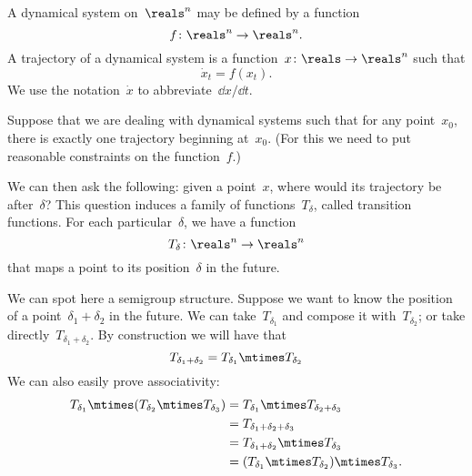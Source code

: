 \begin{example}
  \label{exa:transition-functions}
  \begin{definition}
    \label{def:ct-dynsyst}
    A dynamical system on~$\reals^n$ may be defined by a function
    \begin{equation}
      f\colon \reals^n \to \reals^n.
    \end{equation}
    A trajectory of a dynamical system is a function~$x\colon \reals \to \reals^n$ such that
    \begin{equation}
      \dot{x}_t = f(x_t).
    \end{equation}
    We use the notation~$\dot{x}$ to abbreviate~$\dd x / \dd t$.
  \end{definition}

  Suppose that we are dealing with dynamical systems such that for any point~$x_0$, there
  is exactly one trajectory beginning at~$x_0$. (For this we need to put reasonable constraints
  on the function~$f$.)

  We can then ask the following: given a point~$x$, where would its trajectory be after~$\delta$?
  This question induces a family of functions~$T_\delta$, called transition functions.
  For each particular~$\delta$, we have a function
  \begin{equation*}
    T_{\delta}\colon \reals^n \to  \reals^n
  \end{equation*}
  that maps a point to its position~$\delta$ in the future.

  We can spot here a semigroup structure. Suppose we want to know the position of a point~$\delta_1 + \delta_2$
  in the future. We can take~$T_{\delta_1}$ and compose it with~$T_{\delta_2}$; or take directly~$T_{\delta_1 + \delta_2}$.
  By construction we will have that
  \begin{equation}
    \label{eq:transition-property}
    T_{\delta_1 + \delta_2} = T_{\delta_1} \mtimes T_{\delta_2}
  \end{equation}
  We can also easily prove associativity:
  \begin{equation}
    \begin{aligned}
      T_{\delta_1}\mtimes (T_{\delta_2}\mtimes T_{\delta_3})&=T_{\delta_1}\mtimes T_{\delta_2+\delta_3}\\
      &=T_{\delta_1+\delta_2+\delta_3}\\
      &=T_{\delta_1+\delta_2}\mtimes T_{\delta_3}\\
      &=(T_{\delta_1}\mtimes T_{\delta_2})\mtimes T_{\delta_3}.
    \end{aligned}
  \end{equation}


\end{example}
